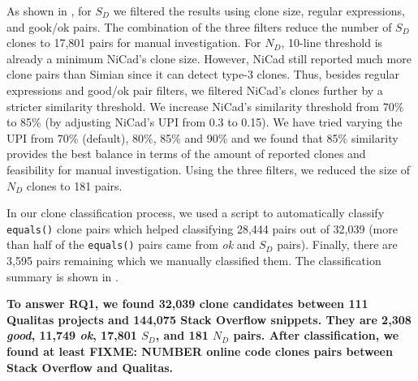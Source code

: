 \documentclass{sig-alternate-05-2015}
\newcommand\FIXME[1]{\textbf{FIXME: #1}}
\begin{document}
As shown in , for $S_D$ we filtered the results using clone size, regular expressions, and gook/ok pairs. The combination of the three filters reduce the number of $S_D$ clones to 17,801 pairs for manual investigation. 
For $N_D$, 10-line threshold is already a minimum NiCad's clone size. However, NiCad still reported much more clone pairs than Simian since it can detect type-3 clones. Thus, besides regular expressions and good/ok pair filters, we filtered NiCad's clones further by a stricter similarity threshold. We increase NiCad's similarity threshold from 70\% to 85\% (by adjusting NiCad's $\mathrm{UPI}$ from 0.3 to 0.15). We have tried varying the UPI from 70\% (default), 80\%, 85\% and 90\% and we found that 85\% similarity provides the best balance in terms of the amount of reported clones and feasibility for manual investigation. Using the three filters, we reduced the size of $N_D$ clones to 181 pairs.

In our clone classification process, we used a script to automatically classify \texttt{equals()} clone pairs which helped classifying 28,444 pairs out of 32,039 (more than half of the \texttt{equals()} pairs came from \textit{ok} and $S_D$ pairs). Finally, there are 3,595 pairs remaining which we manually classified them. The classification summary is shown in .

\textbf{To answer RQ1, we found 32,039 clone candidates between 111 Qualitas projects and 144,075 Stack Overflow snippets. They are 2,308 \textit{good}, 11,749 \textit{ok}, 17,801 $S_D$, and 181 $N_D$ pairs. After classification, we found at least \FIXME{NUMBER} online code clones pairs between Stack Overflow and Qualitas.}

\end{document}
